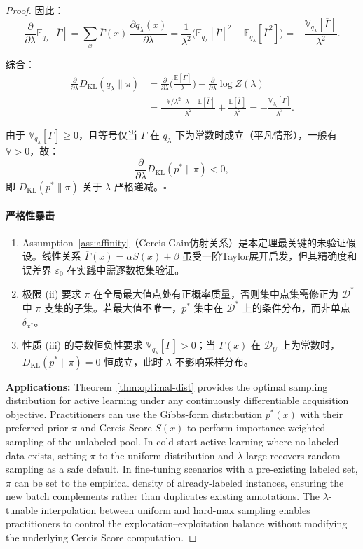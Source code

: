 \documentclass[12pt,a4paper]{article}
\newcommand{\E}{\mathbb{E}}
\newcommand{\V}{\mathbb{V}}
\newcommand{\cD}{\mathcal{D}}
\newcommand{\KL}{D_{\mathrm{KL}}}
\newenvironment{critique}{\paragraph{严格性暴击}\quad}{\par}
\begin{document}
\begin{proof}
因此：
\[
\frac{\partial}{\partial\lambda}\E_{q_\lambda}[\overline{\Gamma}]
= \sum_x \overline{\Gamma}(x)\,\frac{\partial q_\lambda(x)}{\partial\lambda}
= \frac{1}{\lambda^2}\Big(\E_{q_\lambda}[\overline{\Gamma}]^2 - \E_{q_\lambda}[\overline{\Gamma}^2]\Big)
= -\frac{\V_{q_\lambda}[\overline{\Gamma}]}{\lambda^2}.
\]

综合：
\begin{align*}
\frac{\partial}{\partial\lambda}\KL(q_\lambda\|\pi)
&= \frac{\partial}{\partial\lambda}\Big(\frac{\E[\overline{\Gamma}]}{\lambda}\Big)
- \frac{\partial}{\partial\lambda}\log Z(\lambda) \\
&= \frac{-\V/\lambda^2\cdot\lambda - \E[\overline{\Gamma}]}{\lambda^2}
+ \frac{\E[\overline{\Gamma}]}{\lambda^2}
= -\frac{\V_{q_\lambda}[\overline{\Gamma}]}{\lambda^3}.
\end{align*}

由于 $\V_{q_\lambda}[\overline{\Gamma}]\ge 0$，且等号仅当 $\overline{\Gamma}$ 在 $q_\lambda$ 下为常数时成立（平凡情形），一般有 $\V>0$，故：
\[
\frac{\partial}{\partial\lambda}\KL(p^*\|\pi) < 0,
\]
即 $\KL(p^*\|\pi)$ 关于 $\lambda$ 严格递减。\hfill$\square$

\begin{critique}
\begin{enumerate}
    \item Assumption~\ref{ass:affinity}（Cercis-Gain仿射关系）是本定理最关键的未验证假设。线性关系 $\overline{\Gamma}(x)=\alpha S(x)+\beta$ 虽受一阶Taylor展开启发，但其精确度和误差界 $\varepsilon_0$ 在实践中需逐数据集验证。
    \item 极限 (ii) 要求 $\pi$ 在全局最大值点处有正概率质量，否则集中点集需修正为 $\cD^*$ 中 $\pi$ 支集的子集。若最大值不唯一，$p^*$ 集中在 $\cD^*$ 上的条件分布，而非单点 $\delta_{x^*}$。
    \item 性质 (iii) 的导数恒负性要求 $\V_{q_\lambda}[\overline{\Gamma}]>0$；当 $\overline{\Gamma}(x)$ 在 $\cD_U$ 上为常数时，$\KL(p^*\|\pi)=0$ 恒成立，此时 $\lambda$ 不影响采样分布。
\end{enumerate}
\end{critique}

\medskip\noindent
\textbf{Applications:}
Theorem~\ref{thm:optimal-dist} provides the optimal sampling distribution for
active learning under any continuously differentiable acquisition objective.
Practitioners can use the Gibbs-form distribution $p^*(x)$ with their preferred
prior $\pi$ and Cercis Score $S(x)$ to perform importance-weighted sampling of
the unlabeled pool.  In cold-start active learning where no labeled data exists,
setting $\pi$ to the uniform distribution and $\lambda$ large recovers random
sampling as a safe default.  In fine-tuning scenarios with a pre-existing labeled
set, $\pi$ can be set to the empirical density of already-labeled instances,
ensuring the new batch complements rather than duplicates existing annotations.
The $\lambda$-tunable interpolation between uniform and hard-max sampling enables
practitioners to control the exploration--exploitation balance without modifying
the underlying Cercis Score computation.


\end{proof}
\end{document}
